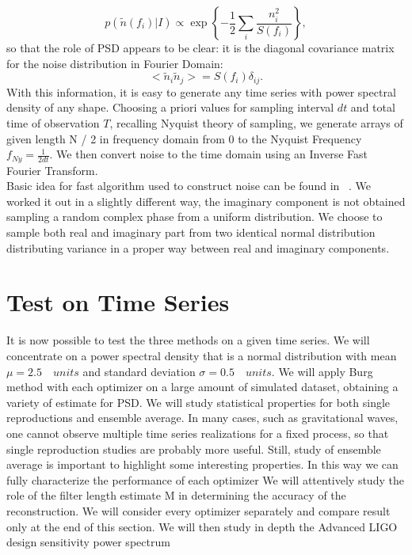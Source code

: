 \documentclass[twocolumn,showpacs,preprintnumbers,nofootinbib,prd,
superscriptaddress,10pt]{revtex4-1}
\begin{document}
\begin{equation}
    p(\tilde{n}(f_i) \vert I) \propto \exp{\left\{-\frac{1}{2}\sum_i\frac{n_i ^2}{S(f_i)}\right\}},
\end{equation}
so that the role of PSD appears to be clear: it is the diagonal covariance matrix for the noise distribution in Fourier Domain: \\
\begin{equation}
    \nonumber
    <\tilde n_i \tilde n_j > = S(f_i)\delta_{ij}.
\end{equation}
With this information, it is easy to generate any time series with power spectral density of any shape.
Choosing a priori values for sampling interval $dt$ and total time of observation $T$, recalling Nyquist theory of sampling, we generate arrays of given length N / 2 in frequency domain from 0 to the Nyquist Frequency $f_{Ny} = \frac{1}{2 dt}$. We then convert noise to the time domain using an Inverse Fast Fourier Transform.\cite{oliphant2006guide}\cite{van2011numpy} \\ Basic idea for fast algorithm used to construct noise can be found in ~\cite{noiseGen}. We worked it out in a slightly different way, the imaginary component is not obtained sampling a random complex phase from a uniform distribution. We choose to sample both real and imaginary part from two identical normal distribution distributing variance in a proper way between real and imaginary components. 
\section{Test on Time Series}
It is now possible to test the three methods on a given time series. We will concentrate on a power spectral density that is a normal distribution with mean $\mu = 2.5 \quad units$ and standard deviation $\sigma = 0.5 \quad units$.
We will apply Burg method with each optimizer on a large amount of simulated dataset, obtaining a variety of estimate for PSD. We will study statistical properties for both single reproductions and ensemble average. In many cases, such as gravitational waves, one cannot observe multiple time series realizations for a fixed process, so that single reproduction studies are probably more useful. Still, study of ensemble average is important to highlight some interesting properties. In this way we can fully characterize the performance of each optimizer 
We will attentively study the role of the filter length estimate M in determining the accuracy of the reconstruction. We will consider every optimizer separately and compare result only at the end of this section. We will then study in depth the Advanced LIGO design sensitivity power spectrum \cite{Ligo}
\end{document}
